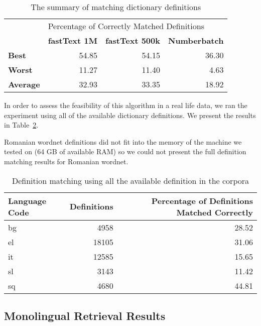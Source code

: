 \begin{table}[htbp]
    \centering
    \begin{tabular}{@{}lrrr@{}}
        \toprule
 & \multicolumn{3}{l}{Percentage of Correctly Matched Definitions} \\ \cmidrule(l){2-4}
 & \textbf{fastText 1M} & \textbf{fastText 500k} & \textbf{Numberbatch} \\ \midrule
        \textbf{Best} & 54.85 & 54.15 & 36.30 \\
        \textbf{Worst} & 11.27 & 11.40 & 4.63 \\
        \textbf{Average} & 32.93 & 33.35 & 18.92 \\
        \bottomrule
    \end{tabular}
    \caption{The summary of matching dictionary definitions}%
    \label{tab:lapjv_summary}
\end{table}

In order to assess the feasibility of this algorithm in a real life data, we ran the experiment using all of the available dictionary definitions.
We present the results in Table~\ref{tab:lapjv_full}.

Romanian wordnet definitions did not fit into the memory of the machine we tested on (64 GB of available RAM) so we could not present the full definition matching results for Romanian wordnet.

\begin{table}[htbp]
    \centering
    \begin{tabular}{@{}lrr@{}}
        \toprule
        \textbf{Language Code} & \textbf{Definitions} & \textbf{Percentage of Definitions Matched Correctly} \\ \midrule
        bg & 4958 & 28.52 \\
        el & 18105 & 31.06 \\
        it & 12585 & 15.65 \\
        sl & 3143 & 11.42 \\
        sq & 4680 & 44.81 \\
        \bottomrule
    \end{tabular}
    \caption{Definition matching using all the available definition in the corpora}%
    \label{tab:lapjv_full}
\end{table}

\subsection{Monolingual Retrieval Results}%
\label{sub:chap4_results}

